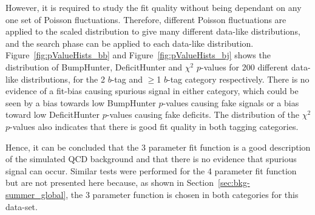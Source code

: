 However, it is required to study the fit quality without being dependant on any one set of Poisson fluctuations.
Therefore, different Poisson fluctuations are applied to the scaled distribution to give many different data-like distributions,
and the search phase can be applied to each data-like distribution.
Figure~\ref{fig:pValueHists_bb} and Figure~\ref{fig:pValueHists_bj} shows the distribution of BumpHunter, DeficitHunter and $\chi^{2}$ \mbox{$p$-value}s for 200 different data-like distributions,
for the 2 $b$-tag and $\geq$1 $b$-tag category respectively.
There is no evidence of a fit-bias causing spurious signal in either category,
which could be seen by a bias towards low BumpHunter \mbox{$p$-value}s causing fake signals
or a bias toward low DeficitHunter \mbox{$p$-value}s causing fake deficits.
The distribution of the $\chi^{2}$ \mbox{$p$-value}s also indicates that there is good fit quality in both tagging categories.

Hence, it can be concluded that the 3 parameter fit function is a good description of the simulated QCD background
and that there is no evidence that spurious signal can occur.
Similar tests were performed for the 4 parameter fit function but are not presented here because,
as shown in Section~\ref{sec:bkg-summer_global},
the 3 parameter function is chosen in both categories for this data-set.

